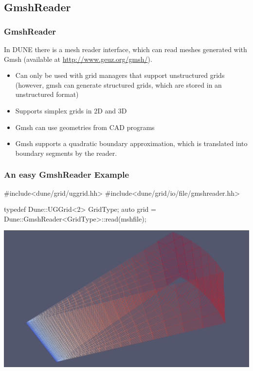 \documentclass[aspectratio=169,11pt]{beamer}
\theoremstyle{definition}
\begin{document}
\subsection{GmshReader}
\label{sec:gmsh}

\begin{frame}[fragile]
\frametitle{GmshReader}
In DUNE there is a mesh reader interface, which can
read meshes generated with Gmsh (available at \url{http://www.geuz.org/gmsh/}).
\begin{itemize}
\item Can only be used with grid managers that support unstructured grids
  (however, gmsh can generate structured grids, which are stored in an
  unstructured format)
\item Supports simplex grids in 2D and 3D
\item Gmsh can use geometries from CAD programs
\item Gmsh supports a quadratic boundary approximation, which is translated into
boundary segments by the reader.
\end{itemize}
\end{frame}

\begin{frame}[fragile]
\frametitle{An easy GmshReader Example}
\begin{cppcode}
#include<dune/grid/uggrid.hh>
#include<dune/grid/io/file/gmshreader.hh>

typedef Dune::UGGrid<2> GridType;
auto grid = Dune::GmshReader<GridType>::read(mshfile);
\end{cppcode}
\begin{center}
  \includegraphics[width=.6\textwidth]{figures/io/easygmsh.png}
\end{center}
\end{frame}
\end{document}
